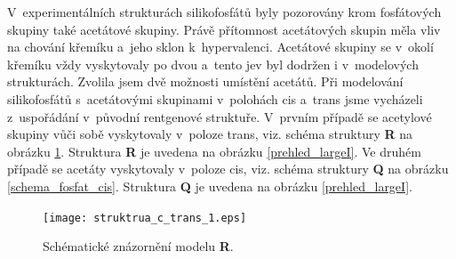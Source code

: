 \documentclass[
digital, %
table,   %
lof,     %
lot,     %
oneside,
]{fithesis3}
\begin{document}
V~experimentálních strukturách silikofosfátů byly pozorovány krom fosfátových skupiny také acetátové skupiny. Právě přítomnost acetátových skupin měla vliv na chování křemíku a~jeho sklon k~hypervalenci. Acetátové skupiny se v~okolí křemíku vždy vyskytovaly po dvou a~tento jev byl dodržen i v~modelových strukturách. Zvolila jsem dvě možnosti umístění acetátů. Při modelování silikofosfátů s~acetátovými skupinami v~polohách cis a~trans jsme vycházeli z~uspořádání v~původní rentgenové struktuře. V~prvním případě se acetylové skupiny vůči sobě vyskytovaly v~poloze trans, viz. schéma struktury \textbf{R} na obrázku \ref{schema_fosfat_trans}. Struktura \textbf{R} je uvedena na obrázku \ref{prehled_largeI}. Ve druhém případě se acetáty vyskytovaly v~poloze cis, viz. schéma struktury \textbf{Q} na obrázku \ref{schema_fosfat_cis}. Struktura \textbf{Q} je uvedena na obrázku \ref{prehled_largeI}.
\begin{figure}\begin{center}\texttt{[image: struktrua\_c\_trans\_1.eps]}
\caption{Schématické znázornění modelu \textbf{R}.}\label{schema_fosfat_trans}
\end{center}\end{figure}
\end{document}
